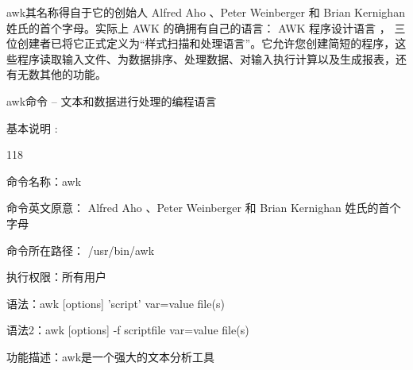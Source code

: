 awk其名称得自于它的创始人 Alfred Aho 、Peter Weinberger 和 Brian Kernighan 姓氏的首个字母。实际上 AWK 的确拥有自己的语言： AWK 程序设计语言 ， 三位创建者已将它正式定义为“样式扫描和处理语言”。它允许您创建简短的程序，这些程序读取输入文件、为数据排序、处理数据、对输入执行计算以及生成报表，还有无数其他的功能。
\begin{ascolorbox5}{awk命令 – 文本和数据进行处理的编程语言}
	\begin{ascboxE}{基本说明 :}
		\begin{dinglist}{118}
			\item 命令名称：awk 
			\item 命令英文原意： Alfred Aho 、Peter Weinberger 和 Brian Kernighan 姓氏的首个字母
			\item 命令所在路径： /usr/bin/awk
			\item 执行权限：所有用户 
			\item 语法：awk [options] 'script' var=value file(s)
			\item 语法2：awk [options] -f scriptfile var=value file(s)
			\item 功能描述：awk是一个强大的文本分析工具
		\end{dinglist}
	\end{ascboxE}
\end{ascolorbox5}


